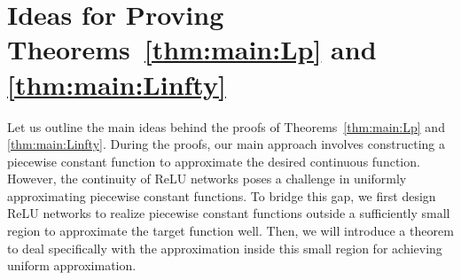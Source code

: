 \documentclass[nohyperref]{article}
\theoremstyle{plain}
\theoremstyle{definition}
\theoremstyle{remark}
\begin{document}
\section{Ideas for Proving Theorems~\ref{thm:main:Lp} and \ref{thm:main:Linfty}}
\label{sec:ideas}

Let us outline the main ideas behind the proofs of Theorems~\ref{thm:main:Lp} and \ref{thm:main:Linfty}.
During the proofs, our main approach involves constructing a piecewise constant function to approximate the desired continuous function.
However, the continuity of ReLU networks poses a challenge in uniformly approximating piecewise constant functions.
To bridge this gap, we first  design ReLU networks
to realize piecewise constant functions outside a sufficiently small region to approximate the target function well. Then, we will introduce a theorem to deal specifically with the approximation inside this small region for achieving uniform approximation.
\end{document}
